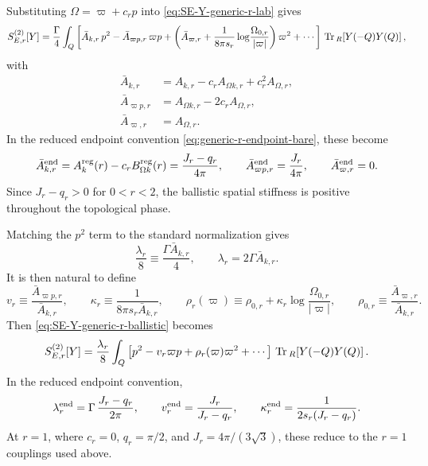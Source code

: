 \documentclass[aps,prx,preprint,amsmath,amssymb]{revtex4-2}
\newcommand{\Tr}{{\rm \, Tr\,}}
\begin{document}
Substituting \(\Omega=\varpi+c_r p\) into \eqref{eq:SE-Y-generic-r-lab} gives
\begin{equation}\label{eq:SE-Y-generic-r-ballistic}
S_{E,r}^{(2)}[Y]
=
\frac{\Gamma}{4}\int_Q
\left[
\bar A_{k,r}\,p^2
-\bar A_{\varpi p,r}\,\varpi p
+\left(
\bar A_{\varpi,r}
+\frac{1}{8\pi s_r}\log\!\frac{\Omega_{0,r}}{|\varpi|}
\right)\varpi^2
+\cdots
\right]
\Tr_R\!\left[Y(-Q)Y(Q)\right],
\end{equation}
with
\begin{align}
\bar A_{k,r}
&=
A_{k,r}-c_rA_{\Omega k,r}+c_r^2A_{\Omega,r},
\label{eq:generic-r-Abar-k}
\\
\bar A_{\varpi p,r}
&=
A_{\Omega k,r}-2c_rA_{\Omega,r},
\label{eq:generic-r-Abar-mix}
\\
\bar A_{\varpi,r}
&=
A_{\Omega,r}.
\label{eq:generic-r-Abar-varpi}
\end{align}
In the reduced endpoint convention \eqref{eq:generic-r-endpoint-bare}, these
become
\begin{equation}\label{eq:generic-r-endpoint-ballistic-coeffs}
\bar A_{k,r}^{\rm end}
=
A_k^{\rm reg}(r)-c_r B_{\Omega k}^{\rm reg}(r)
=
\frac{J_r-q_r}{4\pi},
\qquad
\bar A_{\varpi p,r}^{\rm end}
=
\frac{J_r}{4\pi},
\qquad
\bar A_{\varpi,r}^{\rm end}=0.
\end{equation}
Since \(J_r-q_r>0\) for \(0<r<2\), the ballistic spatial stiffness is positive
throughout the topological phase.

Matching the \(p^2\) term to the standard normalization gives
\begin{equation}\label{eq:generic-r-lambda-def}
\frac{\lambda_r}{8}\equiv \frac{\Gamma\bar A_{k,r}}{4},
\qquad
\lambda_r=2\Gamma\bar A_{k,r}.
\end{equation}
It is then natural to define
\begin{equation}\label{eq:generic-r-rho-def}
v_r\equiv \frac{\bar A_{\varpi p,r}}{\bar A_{k,r}},
\qquad
\kappa_r\equiv \frac{1}{8\pi s_r\bar A_{k,r}},
\qquad
\rho_r(\varpi)\equiv
\rho_{0,r}
+\kappa_r\log\!\frac{\Omega_{0,r}}{|\varpi|},
\qquad
\rho_{0,r}\equiv \frac{\bar A_{\varpi,r}}{\bar A_{k,r}}.
\end{equation}
Then \eqref{eq:SE-Y-generic-r-ballistic} becomes
\begin{equation}\label{eq:SE-Y-generic-r-kernel}
S_{E,r}^{(2)}[Y]
=
\frac{\lambda_r}{8}\int_Q
\left[
p^2-v_r\varpi p+\rho_r(\varpi)\varpi^2+\cdots
\right]
\Tr_R\!\left[Y(-Q)Y(Q)\right].
\end{equation}
In the reduced endpoint convention,
\begin{equation}\label{eq:generic-r-endpoint-rg-couplings}
\lambda_r^{\rm end}
=
\Gamma\,\frac{J_r-q_r}{2\pi},
\qquad
v_r^{\rm end}
=
\frac{J_r}{J_r-q_r},
\qquad
\kappa_r^{\rm end}
=
\frac{1}{2s_r(J_r-q_r)}.
\end{equation}
At \(r=1\), where \(c_r=0\), \(q_r=\pi/2\), and \(J_r=4\pi/(3\sqrt3)\), these
reduce to the \(r=1\) couplings used above.
\end{document}
